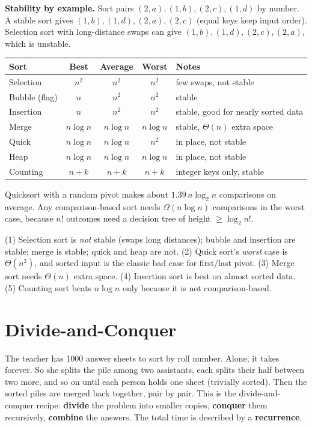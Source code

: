 \documentclass[11pt,a4paper]{article}
\begin{document}
\textbf{Stability by example.} Sort pairs $(2,a),(1,b),(2,c),(1,d)$ by number. A stable sort gives $(1,b),(1,d),(2,a),(2,c)$ (equal keys keep input order). Selection sort with long-distance swaps can give $(1,b),(1,d),(2,c),(2,a)$, which is unstable.

\begin{center}
\small
\begin{tabularx}{\textwidth}{lcccX}
\toprule
\textbf{Sort} & \textbf{Best} & \textbf{Average} & \textbf{Worst} & \textbf{Notes}\\
\midrule
Selection & $n^2$ & $n^2$ & $n^2$ & few swaps, not stable\\
Bubble (flag) & $n$ & $n^2$ & $n^2$ & stable\\
Insertion & $n$ & $n^2$ & $n^2$ & stable, good for nearly sorted data\\
Merge & $n\log n$ & $n\log n$ & $n\log n$ & stable, $\Theta(n)$ extra space\\
Quick & $n\log n$ & $n\log n$ & $n^2$ & in place, not stable\\
Heap & $n\log n$ & $n\log n$ & $n\log n$ & in place, not stable\\
Counting & $n+k$ & $n+k$ & $n+k$ & integer keys only, stable\\
\bottomrule
\end{tabularx}
\end{center}
Quicksort with a random pivot makes about $1.39\,n\log_2 n$ comparisons on average. Any comparison-based sort needs $\Omega(n\log n)$ comparisons in the worst case, because $n!$ outcomes need a decision tree of height $\ge\log_2 n!$.

\begin{trap}
(1) Selection sort is \emph{not} stable (swaps long distances); bubble and insertion are stable; merge is stable; quick and heap are not. (2) Quick sort's \emph{worst} case is $\Theta(n^2)$, and sorted input is the classic bad case for first/last pivot. (3) Merge sort needs $\Theta(n)$ extra space. (4) Insertion sort is best on almost sorted data. (5) Counting sort beats $n\log n$ only because it is not comparison-based.
\end{trap}

\newpage
\section{Divide-and-Conquer}

\begin{story}
The teacher has 1000 answer sheets to sort by roll number. Alone, it takes forever. So she splits the pile among two assistants, each splits their half between two more, and so on until each person holds one sheet (trivially sorted). Then the sorted piles are merged back together, pair by pair. This is the divide-and-conquer recipe: \textbf{divide} the problem into smaller copies, \textbf{conquer} them recursively, \textbf{combine} the answers. The total time is described by a \textbf{recurrence}.
\end{story}
\end{document}
